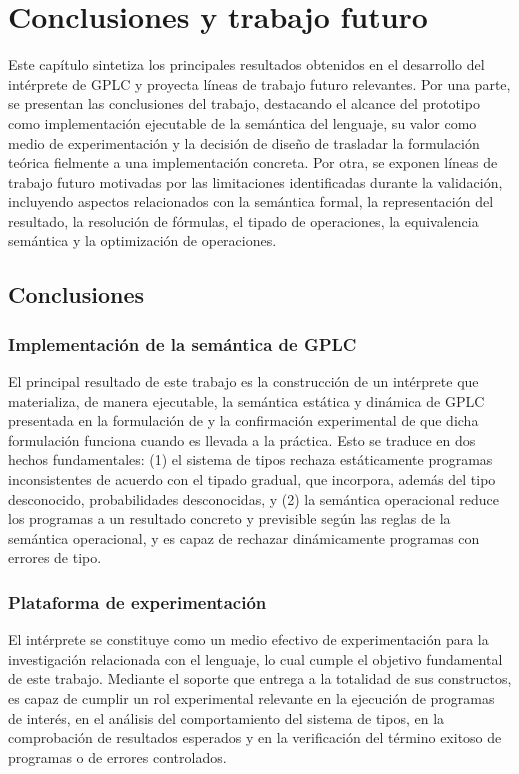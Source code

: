 
\chapter{Conclusiones y trabajo futuro}

Este capítulo sintetiza los principales resultados obtenidos en el desarrollo del intérprete de GPLC y proyecta líneas de trabajo futuro relevantes. Por una parte, se presentan las conclusiones del trabajo, destacando el alcance del prototipo como implementación ejecutable de la semántica del lenguaje, su valor como medio de experimentación y la decisión de diseño de trasladar la formulación teórica fielmente a una implementación concreta. Por otra, se exponen líneas de trabajo futuro motivadas por las limitaciones identificadas durante la validación, incluyendo aspectos relacionados con la semántica formal, la representación del resultado, la resolución de fórmulas, el tipado de operaciones, la equivalencia semántica y la optimización de operaciones.



\section{Conclusiones}

\subsection{Implementación de la semántica de GPLC}



El principal resultado de este trabajo es la construcción de un intérprete que materializa, de manera ejecutable, la semántica estática y dinámica de GPLC presentada en la formulación de \cite{gplc} y la confirmación experimental de que dicha formulación funciona cuando es llevada a la práctica. Esto se traduce en dos hechos fundamentales: (1) el sistema de tipos rechaza estáticamente programas inconsistentes de acuerdo con el tipado gradual, que incorpora, además del tipo desconocido, probabilidades desconocidas, y (2) la semántica operacional reduce los programas a un resultado concreto y previsible según las reglas de la semántica operacional, y es capaz de rechazar dinámicamente programas con errores de tipo.

\subsection{Plataforma de experimentación}
El intérprete se constituye como un medio efectivo de experimentación
para la investigación relacionada con el lenguaje, lo cual cumple el
objetivo fundamental de este trabajo. Mediante el soporte que entrega
a la totalidad de sus constructos, es capaz de cumplir un rol
experimental relevante en la ejecución de programas de interés, en el
análisis del comportamiento del sistema de tipos, en la comprobación de
resultados esperados y en la verificación del término exitoso de programas o de errores controlados.


